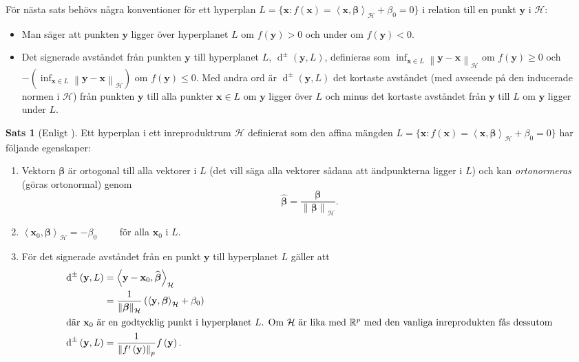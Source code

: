 \documentclass[a4paper, 12pt]{report}
\theoremstyle{definition}
\newtheorem{thm}{Sats}[section]
\theoremstyle{remark}
\newcommand{\bfbeta}{{\boldsymbol{\beta}}}
\newcommand{\bfx}{\mathbf{x}}
\newcommand{\bfy}{\mathbf{y}}
\newcommand{\llangle}{\left\langle}
\newcommand{\rrangle}{\right\rangle}
\newcommand{\sephyp}{\{ \mathbf{x} : f\left(\mathbf{x}\right)=\inner{\bfx}{\bfbeta}_\mathcal{H} + \beta_0=0\}}
\newcommand{\inner}[2]{\llangle #1, #2 \rrangle}
\newcommand{\hil}{\mathcal{H}}
\begin{document}
För nästa sats behövs några konventioner för ett hyperplan $L=\sephyp$ i relation till en punkt
$\bfy$ i $\hil$:
\begin{itemize}
	\item Man säger att punkten $\bfy$ ligger över hyperplanet $L$ om $f\left(\bfy\right)>0$ och under om $f\left(\bfy\right)<0$.
	\item Det signerade avståndet från punkten $\bfy$ till hyperplanet $L$, $\operatorname{d}^\pm\!\left(\bfy, L\right)$, definieras som $\inf_{\bfx\in L} \left\|\bfy-\bfx\right\|_\hil$ om $f\left(\bfy\right)\geq0$ och $-\left(\inf_{\bfx\in L} \left\|\bfy-\bfx\right\|_\hil\right)$ om $f\left(\bfy\right)\leq0$.
	Med andra ord är $\operatorname{d}^\pm\left(\bfy, L\right)$ det kortaste avståndet (med avseende på den inducerade normen i $\hil$) från punkten $\bfy$ till alla punkter $\bfx\in L$ om $\bfy$ ligger över $L$ och minus det kortaste avståndet från $\bfy$ till $L$ om $\bfy$ ligger under $L$.
\end{itemize}
\newpage
\begin{thm}[Enligt \cite{ESL}]\label{thm:hyperplan}
	Ett hyperplan i ett inreproduktrum $\hil$ definierat som den affina mängden $L=\sephyp$ har följande egenskaper:
	\begin{enumerate}
		\item Vektorn $\bfbeta$ är ortogonal till alla vektorer i $L$ (det vill säga alla vektorer sådana att ändpunkterna ligger i $L$) och kan \emph{ortonormeras} (göras ortonormal) genom
		\begin{equation*}
			\widehat{\bfbeta} = \frac{\bfbeta}{\left\|\bfbeta\right\|_\hil}.
		\end{equation*}
		\item \hspace{0.325\linewidth}$\inner{\bfx_0}{\bfbeta}_\hil = -\beta_0\qquad$ för alla $\mathbf{x}_0$ i $L$.
		\item
		För det signerade avståndet från en punkt $\mathbf{y}$ till hyperplanet $L$ gäller att
		\begin{align*}
			\operatorname{d}^\pm \left(\mathbf{y}, L\right) &=\inner{\mathbf{y}-\mathbf{x}_0}{\widehat{\bfbeta}}_\hil\\
			&=\frac{1}{\left\|\bfbeta\right\|_\hil}\left(\inner{\mathbf{y}}{\bfbeta}_\hil+\beta_0\right)\\
\intertext{där $\bfx_0$ är en godtycklig punkt i hyperplanet $L$. Om $\hil$ är lika med $\mathbb{R}^p$ med den vanliga inreprodukten fås dessutom}
			\operatorname{d}^\pm \left(\mathbf{y}, L\right)			&=\frac{1}{\left\|f^\prime\left(\mathbf{y}\right)\right\|_p}f\left(\mathbf{y}\right).
		\end{align*}
	\end{enumerate}
\end{thm}
\end{document}
